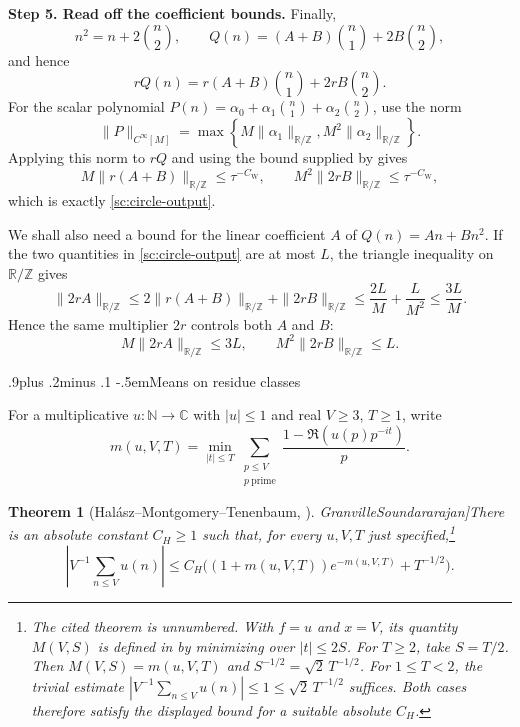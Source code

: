 \documentclass[twoside]{aomart}
\makeatletter
\theoremstyle{paperplain}
\newtheorem{theorem}{Theorem}[section]
\theoremstyle{paperdefinition}
\renewcommand\subsection{\@startsection{subsection}{2}{\z@}
  {.9\baselineskip plus .2\baselineskip minus .1\baselineskip}
  {-.5em}{\normalfont\bfseries}}
\renewenvironment{proof}[1][\proofname]{\par\pushQED{\qed}%
  \normalfont\topsep6\p@\@plus3\p@\relax\trivlist
  \item[\hskip\labelsep\itshape #1\@addpunct{.}]\ignorespaces
}{\popQED\endtrivlist\@endpefalse}
\newcommand{\Z}{\mathbb Z}
\newcommand{\N}{\mathbb N}
\newcommand{\R}{\mathbb R}
\newcommand{\C}{\mathbb C}
\numberwithin{equation}{section}
\makeatother
\begin{document}
\begin{proof}
\medskip
\noindent\textbf{Step 5. Read off the coefficient bounds.}
Finally,
\[
 n^2=n+2\binom n2,
 \qquad
 Q(n)=(A+B)\binom n1+2B\binom n2,
\]
and hence
\[
 rQ(n)=r(A+B)\binom n1+2rB\binom n2.
\]
For the scalar polynomial
$P(n)=\alpha_0+\alpha_1\binom n1+\alpha_2\binom n2$, use the norm
\[
 \|P\|_{C^\infty[M]}
 =\max\left\{M\|\alpha_1\|_{\mathbb R/\mathbb Z},
                 M^2\|\alpha_2\|_{\mathbb R/\mathbb Z}\right\}.
\]
Applying this norm to $rQ$ and using the bound supplied by 
gives
\[
 M\|r(A+B)\|_{\mathbb R/\mathbb Z}\le\tau^{-C_{\mathrm W}},\qquad
 M^2\|2rB\|_{\mathbb R/\mathbb Z}\le\tau^{-C_{\mathrm W}},
\]
which is exactly \eqref{sc:circle-output}.
\end{proof}


We shall also need a bound for the linear coefficient $A$ of
$Q(n)=An+Bn^2$. If the two quantities in \eqref{sc:circle-output}
are at most $L$, the triangle inequality on $\R/\Z$ gives
\begin{equation*}
 \|2rA\|_{\R/\Z}
 \le2\|r(A+B)\|_{\R/\Z}+\|2rB\|_{\R/\Z}
 \le\frac{2L}{M}+\frac{L}{M^2}
 \le\frac{3L}{M}.
\end{equation*}
Hence the same multiplier $2r$ controls both $A$ and $B$:
\begin{equation}
 M\|2rA\|_{\R/\Z}\le3L,\qquad
 M^2\|2rB\|_{\R/\Z}\le L.
 \label{sc:dense-bsz-coefficient-bounds}
\end{equation}

\enlargethispage{2pt}
\subsection{Means on residue classes}

For a multiplicative $u:\N\to\C$ with $|u|\le1$ and real
$V\ge3$, $T\ge1$, write
\begin{equation*}
 m(u,V,T)=\min_{|t|\le T}\sum_{\substack{p\le V\\p\ \mathrm{prime}}}
                       \frac{1-\Re(u(p)p^{-it})}{p}.
\end{equation*}
\newcommand{\HMTTheoremCitation}{\cite[p.~1192]{GranvilleSoundararajan}}
\begin{theorem}[Hal\'asz--Montgomery--Tenenbaum, \HMTTheoremCitation]\label{sc:halasz-external}
There is an absolute constant $C_H\ge1$ such that, for every $u,V,T$
just specified,\footnote{The cited theorem is unnumbered. With $f=u$ and
$x=V$, its quantity $M(V,S)$ is defined in
\cite[(1.2), p.~1192]{GranvilleSoundararajan} by minimizing over $|t|\le2S$.
For $T\ge2$, take $S=T/2$. Then $M(V,S)=m(u,V,T)$ and
$S^{-1/2}=\sqrt2\,T^{-1/2}$. For $1\le T<2$, the trivial estimate
$|V^{-1}\sum_{n\le V}u(n)|\le1\le\sqrt2\,T^{-1/2}$ suffices.
Both cases therefore satisfy the displayed bound for a suitable absolute $C_H$.}
\begin{equation*}
 \left|V^{-1}\sum_{n\le V}u(n)\right|
 \le C_H\bigl((1+m(u,V,T))e^{-m(u,V,T)}+T^{-1/2}\bigr).
\end{equation*}
\end{theorem}
\end{document}
